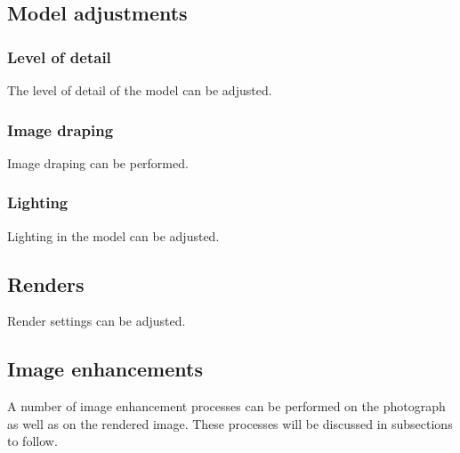 \documentclass[11pt,a4paper]{report}
\begin{document}
		\subsection{Model adjustments}
			\subsubsection{Level of detail}
				The level of detail of the model can be adjusted.
				
			\subsubsection{Image draping}
				Image draping can be performed.
			
			\subsubsection{Lighting}
				Lighting in the model can be adjusted.
		
		\subsection{Renders}
			Render settings can be adjusted.
			
		\subsection{Image enhancements}
			A number of image enhancement processes can be performed on the photograph as well as on the rendered image. These processes will be discussed in subsections to follow.
\end{document}
